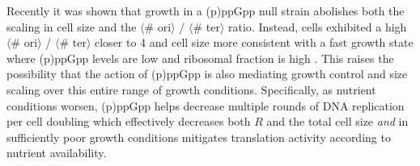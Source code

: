 Recently it was shown that growth in a (p)ppGpp null strain abolishes both the
scaling in cell size and the $\langle$\# ori$\rangle$ / $\langle$\# ter$\rangle$
ratio. Instead, cells exhibited a high $\langle$\# ori$\rangle$ / $\langle$\#
ter$\rangle$ closer to 4 and cell size more consistent with a fast growth state
where (p)ppGpp levels are low \citep{fernandezcoll2020} and ribosomal fraction
is high \citep{zhu2019}. This raises the possibility that the action of (p)ppGpp
is also mediating growth control and size scaling over this entire range of
growth conditions. Specifically, as nutrient conditions worsen, (p)ppGpp helps
decrease multiple rounds of DNA replication per cell doubling which effectively
decreases both $R$ and the total cell size \textit{and} in sufficiently poor
growth conditions mitigates translation activity according to nutrient
availability.
